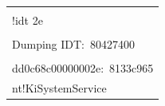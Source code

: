\begin{table}\small %


\begin{minipage}[b]{60mm}%


\begin{center}




\begin{tabular}{|l|}


\hline


\\[-9pt]


{\sf !idt 2e}\\[-6pt]


\\


{\sf Dumping IDT:\ 80427400}\\[-6pt]


\\


{\sf dd0c68c00000002e:\ 8133c965}\\


{\sf nt!KiSystemService} \\


\hline


\end{tabular}








\end{center}






\end{minipage}


\hfill




\begin{minipage}[b]{60mm}


  \begin{center}






  \begin{tabular}{|l|}



\end{tabular}
\end{center}
\end{minipage}
\end{table}
